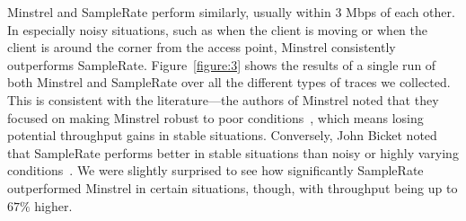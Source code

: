 \documentclass[twocolumn,10pt]{article}
\begin{document}
Minstrel and SampleRate perform similarly, usually within 3 Mbps of
each other.  In especially noisy situations, such as when the client
is moving or when the client is around the corner from the access
point, Minstrel consistently outperforms SampleRate.
Figure~\ref{figure:3} shows the results of a single run of both
Minstrel and SampleRate over all the different types of traces we
collected.  This is consistent with the literature---the authors of
Minstrel noted that they focused on making Minstrel robust to poor
conditions~\cite{minstrel}, which means losing potential throughput
gains in stable situations.  Conversely, John Bicket noted that
SampleRate performs better in stable situations than noisy or highly
varying conditions~\cite{samplerate}.  We were slightly surprised to
see how significantly SampleRate outperformed Minstrel in certain
situations, though, with throughput being up to $67\%$ higher.
\end{document}
